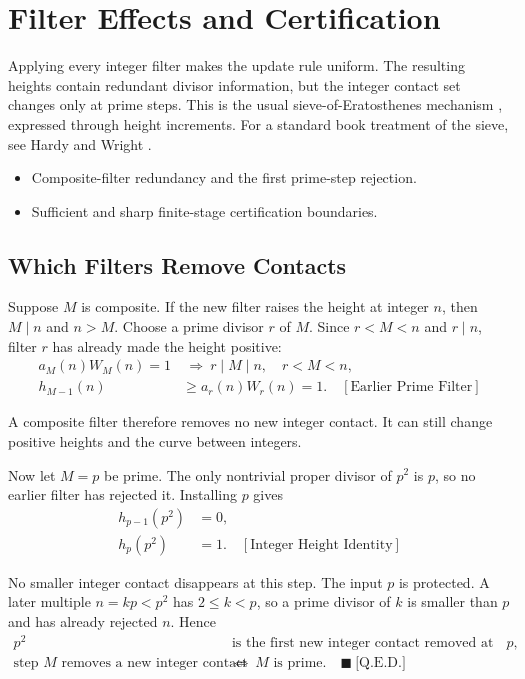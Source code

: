 \section{Filter Effects and Certification}
Applying every integer filter makes the update rule uniform. The resulting
heights contain redundant divisor information, but the integer contact set
changes only at prime steps. This is the usual sieve-of-Eratosthenes mechanism
\cite{dlmfsieve}, expressed through height increments. For a standard book
treatment of the sieve, see Hardy and Wright \cite{hardywright1979}.

\begin{itemize}
\item Composite-filter redundancy and the first prime-step rejection.
\item Sufficient and sharp finite-stage certification boundaries.
\end{itemize}

\subsection{Which Filters Remove Contacts}

Suppose $M$ is composite. If the new filter raises the height at integer $n$,
then $M\mid n$ and $n > M$. Choose a prime divisor $r$ of $M$. Since
$r < M < n$ and $r\mid n$, filter $r$ has already made the height positive:
\begin{equation*}
\begin{aligned}
a_M(n)W_M(n)=1
&\ \Longrightarrow\ r\mid M\mid n,\quad r < M < n,\\
h_{M-1}(n)&\ge a_r(n)W_r(n)=1.
\quad[\text{Earlier Prime Filter}]
\end{aligned}
\end{equation*}

A composite filter therefore removes no new integer contact. It can still
change positive heights and the curve between integers.

Now let $M=p$ be prime. The only nontrivial proper divisor of $p^2$ is $p$,
so no earlier filter has rejected it. Installing $p$ gives
\begin{equation*}
\begin{aligned}
h_{p-1}(p^2)&=0,\\
h_p(p^2)&=1.
\quad[\text{Integer Height Identity}]
\end{aligned}
\end{equation*}

No smaller integer contact disappears at this step. The input $p$ is
protected. A later multiple $n=kp < p^2$ has $2\le k < p$, so a prime divisor
of $k$ is smaller than $p$ and has already rejected $n$. Hence
\begin{equation*}
\begin{aligned}
p^2&\text{ is the first new integer contact removed at step }p,\\
\text{step }M\text{ removes a new integer contact}
&\ \Longleftrightarrow\ M\text{ is prime}.
\quad\blacksquare\ \text{[Q.E.D.]}
\end{aligned}
\end{equation*}

